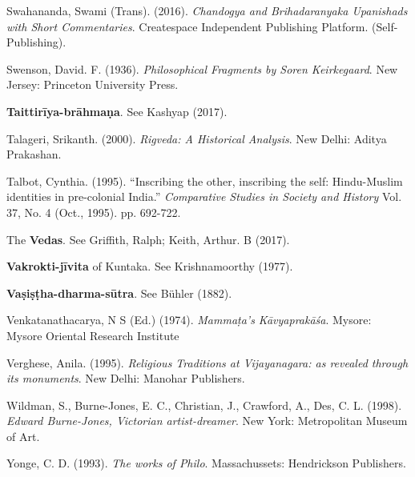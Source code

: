 \begin{thebibliography}{99}
Swahananda, Swami (Trans). (2016). {\sl Chandogya and Brihadaranyaka Upanishads with Short Commentaries}. Createspace Independent Publishing Platform. (Self-Publishing). 

Swenson, David. F. (1936). {\sl Philosophical Fragments by Soren Keirkegaard}. New Jersey: Princeton University Press. 

{\bf Taittirīya-brāhmaṇa}. See Kashyap (2017).

Talageri, Srikanth. (2000). {\sl Rigveda: A Historical Analysis}. New Delhi: Aditya Prakashan. 

Talbot, Cynthia. (1995). “Inscribing the other, inscribing the self: Hindu-Muslim identities in pre-colonial India.” {\sl Comparative Studies in Society and History} Vol. 37, No. 4 (Oct., 1995). pp. 692-722.

The {\bf Vedas}. See Griffith, Ralph; Keith, Arthur. B (2017).

{\bf Vakrokti-jīvita} of Kuntaka. See Krishnamoorthy (1977).

{\bf Vaṣiṣṭha-dharma-sūtra}. See Bühler (1882).

Venkatanathacarya, N S (Ed.) (1974). {\sl Mammaṭa’s Kāvyaprakāśa}. Mysore: Mysore Oriental Research Institute

Verghese, Anila. (1995). {\sl Religious Traditions at Vijayanagara: as revealed through its monuments}. New  Delhi: Manohar Publishers. 

Wildman, S., Burne-Jones, E. C., Christian, J., Crawford, A., Des, C. L. (1998). {\sl Edward Burne-Jones, Victorian artist-dreamer}. New York: Metropolitan Museum of Art. 

Yonge, C. D. (1993). {\sl The works of Philo}. Massachussets: Hendrickson Publishers.
\end{thebibliography}

\theendnotes
